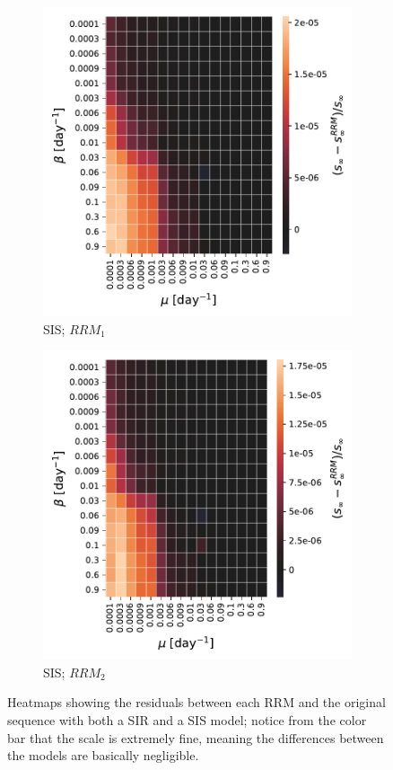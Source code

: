 \documentclass[a4paper,11pt, twocolumn]{article}
\begin{document}
\begin{figure}[H]
\begin{subfigure}[t]{0.24\textwidth}
\centering
\includegraphics[scale=0.32]{./Figure/Simulations/SIS_temporal_RRM_nodes_26593_diff.pdf}
\caption{SIS; $RRM_1$}
\end{subfigure}
\begin{subfigure}[t]{0.24\textwidth}
 \centering
\includegraphics[scale=0.32]{./Figure/Simulations/SIS_temporal_RRM_time_65839_diff.pdf}
\caption{SIS; $RRM_2$}
\end{subfigure}

\caption{Heatmaps showing the residuals between each RRM and the original sequence with both a SIR and a SIS model; notice from the color bar that the scale is extremely fine, meaning the differences between the models are basically negligible.}
\end{figure}
\end{document}

